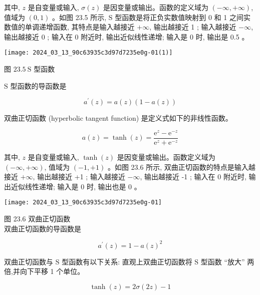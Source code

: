\documentclass[10pt]{article}
\begin{document}
\begin{CJK*}{UTF8}{bsmi}
其中, $z$ 是自变量或输入, $\sigma(z)$ 是因变量或输出。函数的定义域为 $(-\infty,+\infty)$, 值域为 $(0,1)$ 。如图 23.5 所示, $\mathrm{S}$ 型函数是将正负实数值映射到 0 和 1 之间实数值的单调递增函数, 其特点是输入越接近 $+\infty$, 输出越接近 1 ; 输入越接近 $-\infty$, 输出越接近 0 ; 输入在 0 附近时, 输出近似线性递增; 输入是 0 时, 输出是 0.5 。

\begin{center}
\texttt{[image: 2024\_03\_13\_90c63935c3d97d7235e0g-01(1)]}
\end{center}

图 $23.5 \mathrm{~S}$ 型函数

$\mathrm{S}$ 型函数的导函数是


\begin{equation*}
a^{\prime}(z)=a(z)(1-a(z)) \tag{23.15}
\end{equation*}


双曲正切函数 (hyperbolic tangent function) 是定义式如下的非线性函数。


\begin{equation*}
a(z)=\tanh (z)=\frac{\mathrm{e}^{z}-\mathrm{e}^{-z}}{\mathrm{e}^{z}+\mathrm{e}^{-z}} \tag{23.16}
\end{equation*}


其中, $z$ 是自变量或输入, $\tanh (z)$ 是因变量或输出。函数定义域为 $(-\infty,+\infty)$, 值域为 $(-1,+1)$ 。如图 23.6 所示, 双曲正切函数的特点是输入越接近 $+\infty$, 输出越接近 +1 ; 输入越接近 $-\infty$, 输出越接近 -1 ; 输入在 0 附近时, 输出近似线性递增; 输入是 0 时, 输出也是 0 。

\begin{center}
\texttt{[image: 2024\_03\_13\_90c63935c3d97d7235e0g-01]}
\end{center}

图 23.6 双曲正切函数\\
双曲正切函数的导函数是


\begin{equation*}
a^{\prime}(z)=1-a(z)^{2} \tag{23.17}
\end{equation*}


双曲正切函数与 $\mathrm{S}$ 型函数有以下关系: 直观上双曲正切函数将 $\mathrm{S}$ 型函数 “放大” 两倍,并向下平移 1 个单位。


\begin{equation*}
\tanh (z)=2 \sigma(2 z)-1 \tag{23.18}
\end{equation*}



\end{CJK*}
\end{document}
